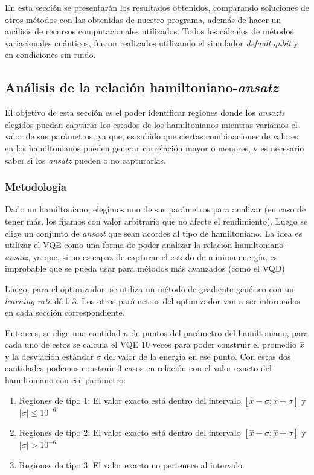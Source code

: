 En esta sección se presentarán los resultados obtenidos, comparando soluciones de otros métodos con las obtenidas de nuestro programa, además de hacer un análisis de recursos computacionales utilizados. Todos los cálculos de métodos variacionales cuánticos, fueron realizados utilizando el simulador \textit{default.qubit} y en condiciones sin ruido.


\subsection{Análisis de la relación hamiltoniano-\textit{ansatz}}
El objetivo de esta sección es el poder identificar regiones donde los \textit{ansazts} elegidos puedan capturar los estados de los hamiltonianos mientras variamos el valor de sus parámetros, ya que, es sabido que ciertas combinaciones de valores en los hamiltonianos pueden generar correlación mayor o menores, y es necesario saber si los \textit{ansatz} pueden o no capturarlas.

\subsubsection{Metodología}
Dado un hamiltoniano, elegimos uno de sus parámetros para analizar (en caso de tener más, los fijamos con valor arbitrario que no afecte el rendimiento). Luego se elige un conjunto de \textit{ansazt} que sean acordes al tipo de hamiltoniano. La idea es utilizar el VQE como una forma de poder analizar la relación hamiltoniano-\textit{ansatz}, ya que, si no es capaz de capturar el estado de mínima energía, es improbable que se pueda usar para métodos más avanzados (como el VQD)

Luego, para el optimizador, se utiliza un método de gradiente genérico con un \textit{learning rate} dé $0.3$. Los otros parámetros del optimizador van a ser informados en cada sección correspondiente. 

Entonces, se elige una cantidad $n$ de puntos del parámetro del hamiltoniano, para cada uno de estos se calcula el VQE $10$ veces para poder construir el promedio $\hat{x}$ y la desviación estándar $\sigma$ del valor de la energía en ese punto. Con estas dos cantidades podemos construir 3 casos en relación con el valor exacto del hamiltoniano con ese parámetro:
\begin{enumerate}
    \item Regiones de tipo 1: El valor exacto está dentro del intervalo $[\hat{x}-\sigma; \hat{x}+\sigma]$ y $|\sigma| \leq 10^{-6}$
    \item Regiones de tipo 2: El valor exacto está dentro del intervalo $[\hat{x}-\sigma; \hat{x}+\sigma]$ y $|\sigma| > 10^{-6}$
    \item Regiones de tipo 3: El valor exacto no pertenece al intervalo.
\end{enumerate}

